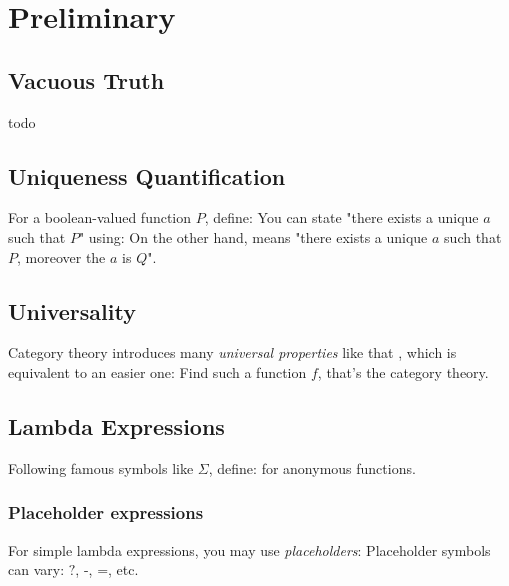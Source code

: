 \section{Preliminary}

\subsection{Vacuous Truth}
todo

\subsection{Uniqueness Quantification}

For a boolean-valued function $P$, define:
You can state "there exists a unique $a$ such that $P$" using:
On the other hand,
means "there exists a unique $a$ such that $P$, moreover the $a$ is $Q$".

\subsection{Universality}

Category theory introduces many \textit{universal properties} like that 
, which is equivalent to an easier one:
Find such a function $f$, that's the category theory.


\subsection{Lambda Expressions}

Following famous symbols like $\Sigma$, define:
for anonymous functions.

\subsubsection{Placeholder expressions}

For simple lambda expressions, you may use \textit{placeholders}:
Placeholder symbols can vary: $\texttt{?}$, $\texttt{-}$, $\texttt{=}$, etc.


